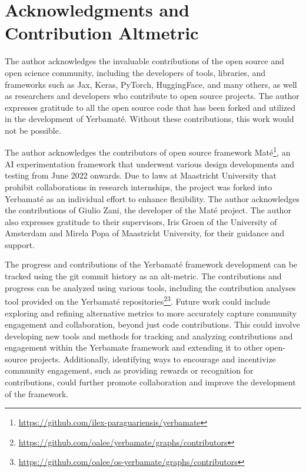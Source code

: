 

\section{Acknowledgments and Contribution Alt\-metric}

The author acknowledges the invaluable contributions of the open source and open science community, including the developers of tools, libraries, and frameworks such as Jax, Keras, PyTorch, HuggingFace, and many others, as well as researchers and developers who contribute to open source projects. The author expresses gratitude to all the open source code that has been forked and utilized in the development of Yerbamaté. Without these contributions, this work would not be possible.


The author acknowledges the contributors of open source framework Maté\footnote{\url{https://github.com/ilex-paraguariensis/yerbamate}}, an AI experimentation framework that underwent various design developments and testing from June 2022 onwards. Due to laws at Maastricht University that prohibit collaborations in research internships, the project was forked into Yerbamaté as an individual effort to enhance flexibility. The author acknowledges the contributions of Giulio Zani, the developer of the Maté project.
The author also expresses gratitude to their supervisors, Iris Groen of the University of Amsterdam and Mirela Popa of Maastricht University, for their guidance and support. 

The progress and contributions of the Yerbamaté framework development can be tracked using the git commit history as an alt-metric. The contributions and progress can be analyzed using various tools, including the contribution analyses tool provided on the Yerbamaté repositories\footnote{\url{https://github.com/oalee/yerbamate/graphs/contributors}}\footnote{\url{https://github.com/oalee/os-yerbamate/graphs/contributors}}. Future work could include exploring and refining alternative metrics to more accurately capture community engagement and collaboration, beyond just code contributions. This could involve developing new tools and methods for tracking and analyzing contributions and engagement within the Yerbamate framework and extending it to other open-source projects. Additionally, identifying ways to encourage and incentivize community engagement, such as providing rewards or recognition for contributions, could further promote collaboration and improve the development of the framework.

